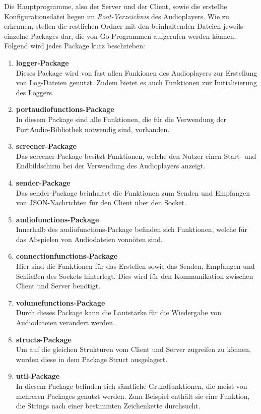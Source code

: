 Die Hauptprogramme, also der Server und der Client, sowie die erstellte
Konfigurationsdatei liegen im \textit{Root-Verzeichnis} des Audioplayers. Wie
zu erkennen, stellen die restlichen Ordner mit den beinhaltenden Dateien
jeweils einzelne Packages dar, die von Go-Programmen aufgerufen werden können. \\
Folgend wird jedes Package kurz beschrieben:  
\begin{enumerate}
\item \textbf{logger-Package} \\
Dieses Package wird von fast allen Funkionen des Audioplayers zur Erstellung
von Log-Dateien genutzt. Zudem bietet es auch Funktionen zur Initialisierung des
Loggers.

\item \textbf{portaudiofunctions-Package} \\
In diesem Package sind alle Funktionen, die für die Verwendung der
PortAudio-Bibliothek notwendig sind, vorhanden. 


\item \textbf{screener-Package} \\
Das screener-Package besitzt Funktionen, welche den Nutzer einen Start- und
Endbildschirm bei der Verwendung des Audioplayers anzeigt.


\item \textbf{sender-Package} \\
Das sender-Package beinhaltet die Funktionen zum Senden und Empfangen von
JSON-Nachrichten für den Client über den Socket.


\item \textbf{audiofunctions-Package} \\
Innerhalb des audiofunctions-Package befinden sich Funktionen, welche für das
Abspielen von Audiodateien vonnöten sind.

\item \textbf{connectionfunctions-Package} \\
Hier sind die Funktionen für das Erstellen sowie das Senden, Empfangen und
Schließen des Sockets hinterlegt. Dies wird für den Kommunikation zwischen
Client und Server benötigt.

\item \textbf{volumefunctions-Package} \\
Durch dieses Package kann die Lautstärke für die Wiedergabe von Audiodateien
verändert werden.

\item \textbf{structs-Package} \\
Um auf die gleichen Strukturen vom Client und Server zugreifen zu können,
wurden diese in dem Package Struct ausgelagert.

\item \textbf{util-Package} \\
In diesem Package befinden sich sämtliche Grundfunktionen, die meist von
mehreren Packages genutzt werden. Zum Beispiel enthält sie eine Funktion, die
Strings nach einer bestimmten Zeichenkette durchsucht.
\end{enumerate}



